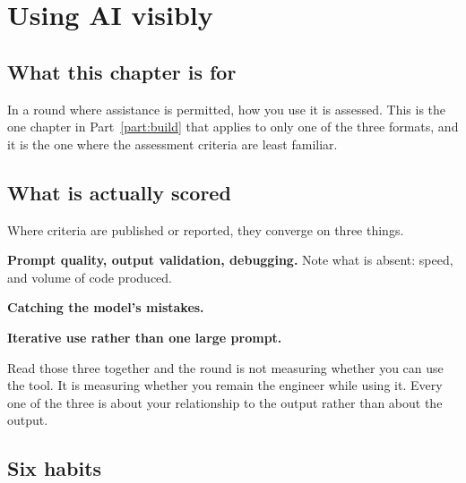 \chapter{Using AI visibly}
\label{ch:ai-visibly}

\section*{What this chapter is for}

In a round where assistance is permitted, how you use it is assessed. This is
the one chapter in Part~\ref{part:build} that applies to only one of the three
formats, and it is the one where the assessment criteria are least familiar.

\section{What is actually scored}

Where criteria are published or reported, they converge on three things.

\textbf{Prompt quality, output validation, debugging.}
 Note what is absent: speed, and volume
of code produced.

\textbf{Catching the model's mistakes.} 

\textbf{Iterative use rather than one large prompt.} 

\begin{kitnote}
Read those three together and the round is not measuring whether you can use
the tool. It is measuring whether you remain the engineer while using it. Every
one of the three is about your relationship to the output rather than about the
output.
\end{kitnote}

\section{Six habits}

